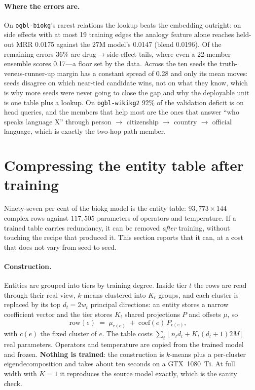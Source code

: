 \documentclass[11pt,a4paper]{article}
\begin{document}
\paragraph{Where the errors are.} On \texttt{ogbl-biokg}'s rarest
relations the lookup beats the embedding outright: on side effects with
at most 19 training edges the analogy feature alone reaches held-out MRR
0.0175 against the 27M model's 0.0147 (blend 0.0196). Of the remaining
errors 36\% are drug$\to$side-effect tails, where even a 22-member
ensemble scores 0.17---a floor set by the data. Across the ten seeds the
truth-versus-runner-up margin has a constant spread of 0.28 and only its
mean moves: seeds disagree on which near-tied candidate wins, not on what
they know, which is why more seeds were never going to close the gap and
why the deployable unit is one table plus a lookup. On
\texttt{ogbl-wikikg2} 92\% of the validation deficit is on head queries,
and the members that help most are the ones that answer ``who speaks
language X'' through person $\to$ citizenship $\to$ country $\to$
official language, which is exactly the two-hop path member.

\section{Compressing the entity table after training}
\label{sec:compress}

Ninety-seven per cent of the biokg model is the entity table:
$93{,}773 \times 144$ complex rows against $117{,}505$ parameters of
operators and temperature. If a trained table carries redundancy, it can
be removed \emph{after} training, without touching the recipe that
produced it. This section reports that it can, at a cost that does not
vary from seed to seed.

\paragraph{Construction.} Entities are grouped into tiers by training
degree. Inside tier $t$ the rows are read through their real view,
$k$-means clustered into $K_t$ groups, and each cluster is replaced by
its top $d_t = 2w_t$ principal directions: an entity stores a narrow
coefficient vector and the tier stores $K_t$ shared projections $P$ and
offsets $\mu$, so
\begin{equation}
\mathrm{row}(e) \;=\; \mu_{c(e)} \;+\; \mathrm{coef}(e)\,P_{c(e)},
\end{equation}
with $c(e)$ the fixed cluster of $e$. The table costs
$\sum_t \left[ n_t d_t + K_t (d_t + 1) 2M \right]$ real parameters.
Operators and temperature are copied from the trained model and frozen.
\textbf{Nothing is trained}: the construction is $k$-means plus a
per-cluster eigendecomposition and takes about ten seconds on a
GTX~1080~Ti. At full width with $K=1$ it reproduces the source model
exactly, which is the sanity check.
\end{document}
